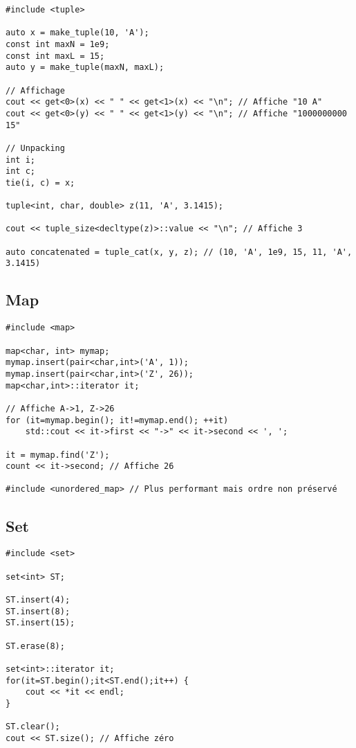 \documentclass{article}
\begin{document}
\begin{multicols*}{3}
\begin{lstlisting}
#include <tuple>

auto x = make_tuple(10, 'A');
const int maxN = 1e9;
const int maxL = 15;
auto y = make_tuple(maxN, maxL);

// Affichage
cout << get<0>(x) << " " << get<1>(x) << "\n"; // Affiche "10 A"
cout << get<0>(y) << " " << get<1>(y) << "\n"; // Affiche "1000000000 15"

// Unpacking
int i;
int c;
tie(i, c) = x;

tuple<int, char, double> z(11, 'A', 3.1415);

cout << tuple_size<decltype(z)>::value << "\n"; // Affiche 3

auto concatenated = tuple_cat(x, y, z); // (10, 'A', 1e9, 15, 11, 'A', 3.1415)

\end{lstlisting}

\subsection*{Map}

\begin{lstlisting}
#include <map>

map<char, int> mymap;
mymap.insert(pair<char,int>('A', 1));
mymap.insert(pair<char,int>('Z', 26));
map<char,int>::iterator it;

// Affiche A->1, Z->26
for (it=mymap.begin(); it!=mymap.end(); ++it)
    std::cout << it->first << "->" << it->second << ', ';

it = mymap.find('Z');
count << it->second; // Affiche 26

#include <unordered_map> // Plus performant mais ordre non préservé

\end{lstlisting}

\subsection*{Set}

\begin{lstlisting}
#include <set>

set<int> ST;

ST.insert(4);
ST.insert(8);
ST.insert(15);

ST.erase(8);

set<int>::iterator it;
for(it=ST.begin();it<ST.end();it++) {
    cout << *it << endl;
}

ST.clear();
cout << ST.size(); // Affiche zéro


\end{lstlisting}
\end{multicols*}
\end{document}
